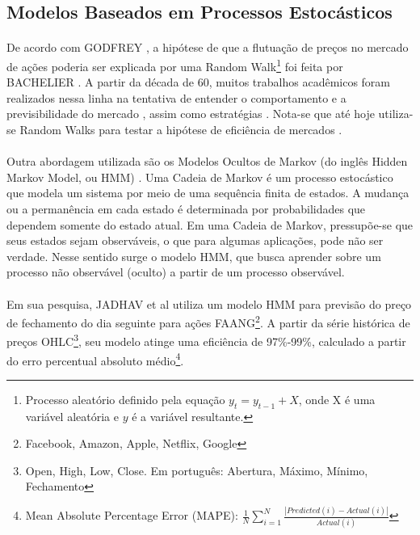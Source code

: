 \subsection{Modelos Baseados em Processos Estocásticos}

\paragraph{} De acordo com GODFREY \cite{godfrey1964random}, a hipótese de que a flutuação de preços no mercado de ações poderia ser explicada por uma Random Walk\footnote{Processo aleatório definido pela equação \begin{math}y_t = y_{t-1} + X\end{math}, onde X é uma variável aleatória e \(y\) é a variável resultante.} foi feita por BACHELIER \cite{bachelier1900theorie}. A partir da década de 60, muitos trabalhos acadêmicos foram realizados nessa linha na tentativa de entender o comportamento e a previsibilidade do mercado \cite{fama1970efficient, solnik1973note, cooper1982world}, assim como estratégias \cite{malkiel2019random}. Nota-se que até hoje utiliza-se Random Walks para testar a hipótese de eficiência de mercados \cite{said2015efficiency}.

\paragraph{} Outra abordagem utilizada são os Modelos Ocultos de Markov (do inglês Hidden Markov Model, ou HMM) \cite{rabiner1989tutorial}. Uma Cadeia de Markov é um processo estocástico que modela um sistema por meio de uma sequência finita de estados. A mudança ou a permanência em cada estado é determinada por probabilidades que dependem somente do estado atual. Em uma Cadeia de Markov, pressupõe-se que seus estados sejam observáveis, o que para algumas aplicações, pode não ser verdade. Nesse sentido surge o modelo HMM, que busca aprender sobre um processo não observável (oculto) a partir de um processo observável.

\paragraph{} Em sua pesquisa, JADHAV et al \cite{jadhav2021forecasting} utiliza um modelo HMM para previsão do preço de fechamento do dia seguinte para ações FAANG\footnote{Facebook, Amazon, Apple, Netflix, Google}. A partir da série histórica de preços OHLC\footnote{Open, High, Low, Close. Em português: Abertura, Máximo, Mínimo, Fechamento}, seu modelo atinge uma eficiência de 97\%-99\%, calculado a partir do erro percentual absoluto médio\footnote{Mean Absolute Percentage Error (MAPE): \begin{math} \frac{1}{N}\sum_{i=1}^{N} \frac{|Predicted(i)-Actual(i)|}{Actual(i)} \end{math}}.


